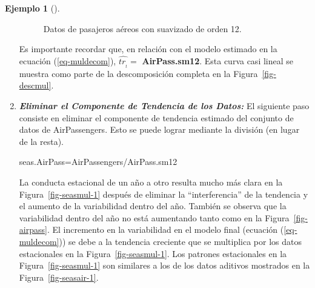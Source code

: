 \documentclass[
  us-letterpaper,
]{scrreprt}
\newenvironment{Shaded}{\begin{snugshade}}{\end{snugshade}}
\newcommand{\NormalTok}[1]{\textcolor[rgb]{0.00,0.23,0.31}{#1}}
\newcommand{\OtherTok}[1]{\textcolor[rgb]{0.00,0.23,0.31}{#1}}
\newcommand{\SpecialCharTok}[1]{\textcolor[rgb]{0.37,0.37,0.37}{#1}}
\theoremstyle{plain}
\theoremstyle{definition}
\theoremstyle{definition}
\newtheorem{example}{Ejemplo}[chapter]
\theoremstyle{plain}
\theoremstyle{remark}
\begin{document}
\begin{example}[]
\begin{tcolorbox}
\begin{enumerate}
\begin{figure}[H]
{  }

  \caption{\label{fig-smap}Datos de pasajeros aéreos con suavizado de
  orden 12.}

  \end{figure}%

  Es importante recordar que, en relación con el modelo estimado en la
  ecuación (\ref{eq-muldecom}), \(\hat{tr_{_t}} =\)
  \textbf{AirPass.sm12}. Esta curva casi lineal se muestra como parte de
  la descomposición completa en la Figura~\ref{fig-descmul}.
\item
  \textbf{\emph{Eliminar el Componente de Tendencia de los Datos:}} El
  siguiente paso consiste en eliminar el componente de tendencia
  estimado del conjunto de datos de AirPassengers. Esto se puede lograr
  mediante la división (en lugar de la resta).

\begin{Shaded}
\begin{Highlighting}[]
\NormalTok{seas.AirPass}\OtherTok{=}\NormalTok{AirPassengers}\SpecialCharTok{/}\NormalTok{AirPass.sm12}
\end{Highlighting}
\end{Shaded}

  La conducta estacional de un año a otro resulta mucho más clara en la
  Figura~\ref{fig-seasmul-1} después de eliminar la ``interferencia'' de
  la tendencia y el aumento de la variabilidad dentro del año. También
  se observa que la variabilidad dentro del año no está aumentando tanto
  como en la Figura~\ref{fig-airpass}. El incremento en la variabilidad
  en el modelo final (ecuación (\ref{eq-muldecom})) se debe a la
  tendencia creciente que se multiplica por los datos estacionales en la
  Figura~\ref{fig-seasmul-1}. Los patrones estacionales en la
  Figura~\ref{fig-seasmul-1} son similares a los de los datos aditivos
  mostrados en la Figura~\ref{fig-seasair-1}.
\end{enumerate}

\begin{figure}[H]

\begin{minipage}{0.50\linewidth}

\end{minipage}
\end{figure}
\end{tcolorbox}
\end{example}
\end{document}
